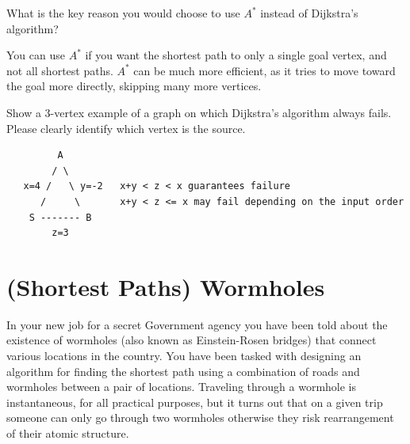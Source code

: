 \begin{problem}[4.]

\ask
What is the key reason you would choose to use $A^*$ instead of
Dijkstra's algorithm?

\sol
You can use $A^*$ if you want the shortest path to only a single goal vertex,
and not all shortest paths. $A^*$ can be much more efficient, as it tries to
move toward the goal more directly, skipping many more vertices.
\end{problem}

\begin{problem}[5.]
\ask
Show a $3$-vertex example of a graph on which Dijkstra's algorithm always
fails. Please clearly identify which vertex is the source.

\sol
\begin{verbatim}
         A 
        / \
   x=4 /   \ y=-2   x+y < z < x guarantees failure
      /     \       x+y < z <= x may fail depending on the input order
    S ------- B
        z=3
\end{verbatim}
\end{problem}


\section{(Shortest Paths) Wormholes}

%



In your new job for a secret Government agency you have been told
about the existence of wormholes (also known as Einstein-Rosen
bridges) that connect various locations in the country.  You have been
tasked with designing an algorithm for finding the shortest path using
a combination of roads and wormholes between a pair of locations.
Traveling through a wormhole is instantaneous, for all practical
purposes, but it turns out that on a given trip someone can only go
through two wormholes otherwise they risk rearrangement of their
atomic structure.

